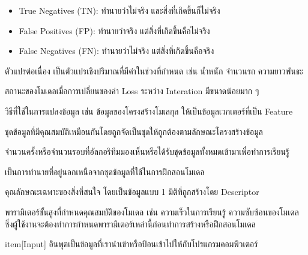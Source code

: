 \begin{description}[style=nextline]
\begin{itemize}
        \item True Negatives (TN): ทำนายว่าไม่จริง และสิ่งที่เกิดขึ้นก็ไม่จริง
        
        \item False Positives (FP): ทำนายว่าจริง แต่สิ่งที่เกิดขึ้นคือไม่จริง
        
        \item False Negatives (FN): ทำนายว่าไม่จริง แต่สิ่งที่เกิดขึ้นคือจริง
    \end{itemize}

    \item[Continuous Variables] ตัวแปรต่อเนื่อง เป็นตัวแปรเชิงปริมาณที่มีค่าในช่วงที่กำหนด เช่น น้ำหนัก จำนวนรถ ความยาวพันธะ

    \item[Convergence] สถานะของโมเดลเมื่อการเปลี่ยนของค่า Loss ระหว่าง Interation มีขนาดน้อยมาก ๆ

    \item[Descriptor] วิธีที่ใช้ในการแปลงข้อมูล เช่น ข้อมูลของโครงสร้างโมเลกุล ให้เป็นข้อมูลเวกเตอร์ที่เป็น Feature

    \item[Dataset หรือ Data Set] ชุดข้อมูลที่มีคุณสมบัติเหมือนกันโดยถูกจัดเป็นชุดให้ถูกต้องตามลักษณะโครงสร้างข้อมูล

    \item[Epoch] จำนวนครั้งหรือจำนวนรอบที่อัลกอริทึมมองเห็นหรือได้รับชุดข้อมูลทั้งหมดเข้ามาเพื่อทำการเรียนรู้

    \item[Extrapolation] เป็นการทำนายที่อยู่นอกเหนือจากชุดข้อมูลที่ใช้ในการฝึกสอนโมเดล

    \item[Feature] คุณลักษณะเฉพาะของสิ่งที่สนใจ โดยเป็นข้อมูลแบบ 1 มิติที่ถูกสร้างโดย Descriptor

    \item[Hyperparameter] พารามิเตอร์ขั้นสูงที่กำหนดคุณสมบัติของโมเดล เช่น ความเร็วในการเรียนรู้ ความซับซ้อนของโมเดล
    ซึ่งผู้ใช้งานจะต้องทำการกำหนดพารามิเตอร์เหล่านี้ก่อนทำการสร้างหรือฝึกสอนโมเดล

    item[Input] อินพุตเป็นข้อมูลที่เรานำเข้าหรือป้อนเข้าไปให้กับโปรแกรมคอมพิวเตอร์


\end{description}
